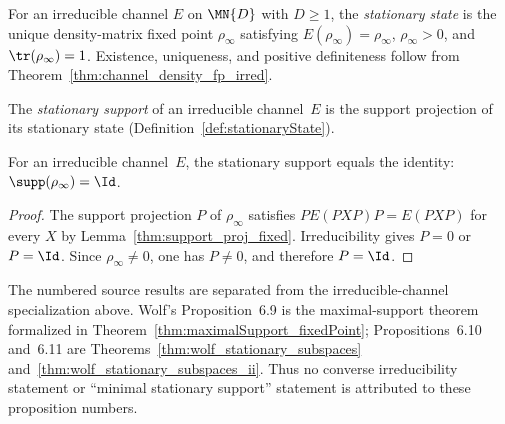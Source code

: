\begin{definition}\label{def:stationaryState}
    \leanok
    For an irreducible channel $E$ on $\MN{D}$ with $D\geq1$, the
    \emph{stationary state} is the unique density-matrix fixed point
    $\rho_\infty$ satisfying $E(\rho_\infty)=\rho_\infty$,
    $\rho_\infty>0$, and $\tr(\rho_\infty)=1$. Existence, uniqueness, and
    positive definiteness follow from
    Theorem~\ref{thm:channel_density_fp_irred}.
\end{definition}

\begin{definition}\label{def:stationarySupport}
    \leanok
    The \emph{stationary support} of an irreducible channel~$E$ is the
    support projection of its stationary state
    (Definition~\ref{def:stationaryState}).
\end{definition}

\begin{theorem}%
    \label{thm:stationarySupport_eq_one}
    \leanok
    For an irreducible channel~$E$, the stationary support equals the
    identity: $\supp(\rho_\infty)=\Id$.
\end{theorem}

\begin{proof}
    \leanok
    The support projection $P$ of $\rho_\infty$ satisfies
    $PE(PXP)P=E(PXP)$ for every $X$ by
    Lemma~\ref{thm:support_proj_fixed}. Irreducibility gives
    $P=0$ or $P=\Id$. Since $\rho_\infty\neq0$, one has $P\neq0$, and
    therefore $P=\Id$.
\end{proof}

\begin{remark}%
    \label{rem:stationary_support_todo}
    The numbered source results are separated from the irreducible-channel
    specialization above. Wolf's Proposition~6.9 is the maximal-support
    theorem formalized in
    Theorem~\ref{thm:maximalSupport_fixedPoint}; Propositions~6.10 and~6.11
    are Theorems~\ref{thm:wolf_stationary_subspaces}
    and~\ref{thm:wolf_stationary_subspaces_ii}. Thus no converse
    irreducibility statement or ``minimal stationary support'' statement is
    attributed to these proposition numbers.
\end{remark}


